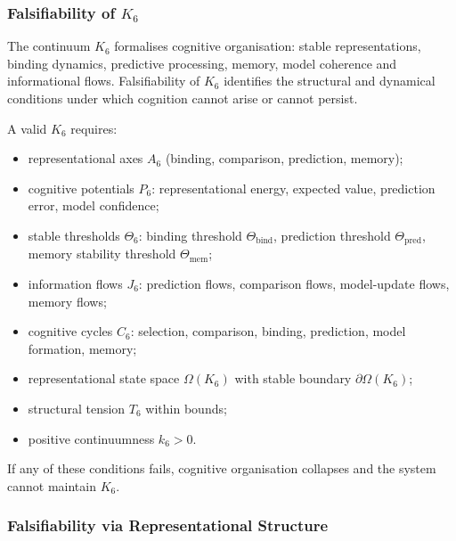 
\subsubsection{Falsifiability of \texorpdfstring{$K_6$}{K_6}}
\label{sec:falsifiability-k6}

The continuum $K_6$ formalises cognitive organisation:
stable representations, binding dynamics, predictive processing,
memory, model coherence and informational flows.
Falsifiability of $K_6$ identifies the structural and dynamical
conditions under which cognition cannot arise or cannot persist.

A valid $K_6$ requires:

\begin{itemize}
    \item representational axes $A_6$ (binding, comparison, prediction, memory);
    \item cognitive potentials $P_6$: representational energy,
          expected value, prediction error, model confidence;
    \item stable thresholds $\Theta_6$: binding threshold $\Theta_{\mathrm{bind}}$,
          prediction threshold $\Theta_{\mathrm{pred}}$,
          memory stability threshold $\Theta_{\mathrm{mem}}$;
    \item information flows $J_6$: prediction flows, comparison flows,
          model-update flows, memory flows;
    \item cognitive cycles $C_6$:
          selection, comparison, binding, prediction, model formation, memory;
    \item representational state space $\Omega(K_6)$ with stable
          boundary $\partial\Omega(K_6)$;
    \item structural tension $T_6$ within bounds;
    \item positive continuumness $k_6>0$.
\end{itemize}

If any of these conditions fails, cognitive organisation collapses
and the system cannot maintain $K_6$.



\subsubsection{Falsifiability via Representational Structure}

